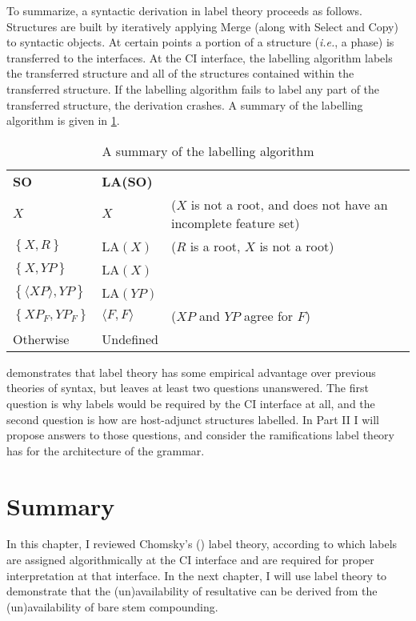 To summarize, a syntactic derivation in label theory proceeds as follows.
Structures are built by iteratively applying Merge (along with Select and Copy) to syntactic objects.
At certain points a portion of a structure (\textit{i.e.}, a phase) is transferred to the interfaces.
At the CI interface, the labelling algorithm labels the transferred structure and all of the structures contained within the transferred structure.
If the labelling algorithm fails to label any part of the transferred structure, the derivation crashes.
A summary of the labelling algorithm is given in \cref{tab:LA-results}.
\begin{table}
	\centering
	\begin{tabular}[t]{llp{5cm}}
		\textbf{SO} & \textbf{LA(SO)} & \\
		\cline{1-2}
		$X$ & $X$ & ($X$ is not a root, and does not have an incomplete feature set)\\
		$\left\{ X, R \right\}$ & LA$(X)$ & ($R$ is a root, $X$ is not a root)\\
		$\left\{ X, YP \right\}$ & LA$(X)$ & \\
		$\left\{ \langle XP\rangle, YP \right\}$ & LA$(YP)$ & \\
		$\left\{ XP_F, YP_F \right\}$ & $\langle F,F\rangle$ & ($XP$ and $YP$ agree for $F$)\\
		Otherwise & Undefined &
	\end{tabular}
	\caption{A summary of the labelling algorithm}
	\label{tab:LA-results}
\end{table}

\textcite{chomsky2015problems} demonstrates that label theory has some empirical advantage over previous theories of syntax, but leaves at least two questions unanswered.
The first question is why labels would be required by the CI interface at all, and the second question is how are host-adjunct structures labelled.
In Part II I will propose answers to those questions, and consider the ramifications label theory has for the architecture of the grammar.

\section{Summary}
In this chapter, I reviewed Chomsky's (\citeyear{chomsky2013problems,chomsky2015problems}) label theory, according to which labels are assigned algorithmically at the CI interface and are required for proper interpretation at that interface.
In the next chapter, I will use label theory to demonstrate that the (un)availability of resultative can be derived from the (un)availability of bare stem compounding.
